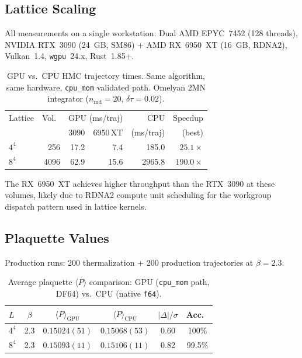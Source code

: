 \documentclass[aps,prl,twocolumn,superscriptaddress,showpacs]{revtex4-2}
\begin{document}
\subsection{Lattice Scaling}

All measurements on a single workstation: Dual AMD EPYC~7452 (128
threads), NVIDIA RTX~3090 (24~GB, SM86) + AMD RX~6950~XT (16~GB,
RDNA2), Vulkan~1.4, \texttt{wgpu}~24.x, Rust~1.85+.

\begin{table}[h]
\caption{GPU vs.\ CPU HMC trajectory times. Same algorithm, same
  hardware, \texttt{cpu\_mom} validated path. Omelyan 2MN integrator
  ($n_\text{md}=20$, $\delta\tau = 0.02$).}
\label{tab:scaling}
\begin{ruledtabular}
\begin{tabular}{lrrrrr}
Lattice & Vol.\ & \multicolumn{2}{c}{GPU (ms/traj)} & CPU & Speedup \\
        &       & 3090 & 6950\,XT & (ms/traj) & (best) \\
\midrule
$4^4$  & 256   & 17.2 & 7.4  & 185.0   & $25.1\times$ \\
$8^4$  & 4096  & 62.9 & 15.6 & 2965.8  & $190.0\times$ \\
\end{tabular}
\end{ruledtabular}
\end{table}

The RX~6950~XT achieves higher throughput than the RTX~3090 at these
volumes, likely due to RDNA2 compute unit scheduling for the workgroup
dispatch pattern used in lattice kernels.

\subsection{Plaquette Values}

Production runs: 200 thermalization + 200 production trajectories at
$\beta = 2.3$.

\begin{table}[h]
\caption{Average plaquette $\langle P \rangle$ comparison: GPU
  (\texttt{cpu\_mom} path, DF64) vs.\ CPU (native \texttt{f64}).}
\label{tab:plaquette}
\begin{ruledtabular}
\begin{tabular}{lccccc}
$L$ & $\beta$ & $\langle P\rangle_\text{GPU}$ &
  $\langle P\rangle_\text{CPU}$ & $|\Delta|/\sigma$ & Acc.\ \\
\midrule
$4^4$ & 2.3 & $0.15024(51)$ & $0.15068(53)$ & 0.60 & 100\% \\
$8^4$ & 2.3 & $0.15093(11)$ & $0.15106(11)$ & 0.82 & 99.5\% \\
\end{tabular}
\end{ruledtabular}
\end{table}
\end{document}
